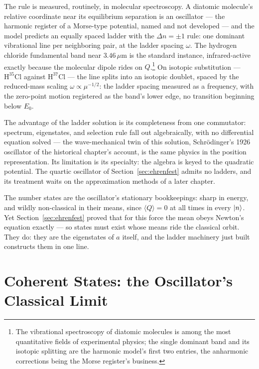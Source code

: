 The rule is measured, routinely, in molecular spectroscopy. A diatomic molecule's relative coordinate near its equilibrium separation is an oscillator --- the harmonic register of a Morse-type potential, named and not developed --- and the model predicts an equally spaced ladder with the $\Delta n = \pm 1$ rule: one dominant vibrational line per neighboring pair, at the ladder spacing $\omega$. The hydrogen chloride fundamental band near $3.46\,\mu\mathrm{m}$ is the standard instance, infrared-active exactly because the molecular dipole rides on $Q$.\footnote{The vibrational spectroscopy of diatomic molecules is among the most quantitative fields of experimental physics; the single dominant band and its isotopic splitting are the harmonic model's first two entries, the anharmonic corrections being the Morse register's business.} On isotopic substitution --- $\mathrm{H}^{35}\mathrm{Cl}$ against $\mathrm{H}^{37}\mathrm{Cl}$ --- the line splits into an isotopic doublet, spaced by the reduced-mass scaling $\omega \propto \mu^{-1/2}$: the ladder spacing measured as a frequency, with the zero-point motion registered as the band's lower edge, no transition beginning below $E_0$.

The advantage of the ladder solution is its completeness from one commutator: spectrum, eigenstates, and selection rule fall out algebraically, with no differential equation solved --- the wave-mechanical twin of this solution, Schr\"odinger's 1926 oscillator of the historical chapter's account, is the same physics in the position representation. Its limitation is its specialty: the algebra is keyed to the quadratic potential. The quartic oscillator of Section~\ref{sec:ehrenfest} admits no ladders, and its treatment waits on the approximation methods of a later chapter.

The number states are the oscillator's stationary bookkeepings: sharp in energy, and wildly non-classical in their means, since $\langle Q\rangle = 0$ at all times in every $\ket{n}$. Yet Section~\ref{sec:ehrenfest} proved that for this force the mean obeys Newton's equation exactly --- so states must exist whose means ride the classical orbit. They do: they are the eigenstates of $a$ itself, and the ladder machinery just built constructs them in one line.

\section{Coherent States: the Oscillator's Classical Limit}
\label{sec:coherent-states}

